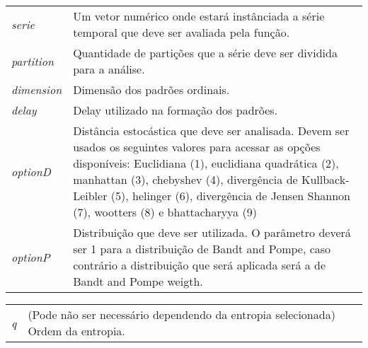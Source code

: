 \begin{table}[!ht]
\begin{center}
\begin{tabularx}{\textwidth}{X X}
\hspace{0.5cm} \textit{serie} \vspace{0.5cm}& Um vetor numérico onde estará instânciada a série temporal que deve ser avaliada pela função.\vspace{0.5cm}\\
\hspace{0.5cm} \textit{partition} \vspace{0.5cm}& Quantidade de partições que a série deve ser dividida para a análise.\vspace{0.5cm}\\
\hspace{0.5cm} \textit{dimension} \vspace{0.5cm}& Dimensão dos padrões ordinais.\vspace{0.5cm}\\
\hspace{0.5cm} \textit{delay} \vspace{0.5cm}& Delay utilizado na formação dos padrões.\vspace{0.5cm}\\
\hspace{0.5cm} \textit{optionD} \vspace{0.5cm}& Distância estocástica que deve ser analisada. Devem ser usados os seguintes valores para acessar as opções disponíveis: Euclidiana (1), euclidiana quadrática (2), manhattan (3), chebyshev (4), divergência de Kullback-Leibler (5), helinger (6), divergência de Jensen Shannon (7), wootters (8) e bhattacharyya (9)\vspace{0.5cm}\\
\hspace{0.5cm} \textit{optionP} \vspace{0.5cm}& Distribuição que deve ser utilizada. O parâmetro deverá ser 1 para a distribuição de Bandt and Pompe, caso contrário a distribuição que será aplicada será a de Bandt and Pompe weigth.\vspace{0.5cm}\\
\end{tabularx}
\end{center}
\end{table} 

\begin{table}[!ht]
\begin{center}
\begin{tabularx}{\textwidth}{X X}
\hspace{0.5cm} \textit{q} \vspace{0.5cm}& (Pode não ser necessário dependendo da entropia selecionada) Ordem da entropia.\vspace{0.5cm}\\
\end{tabularx}
\end{center}
\end{table} 


